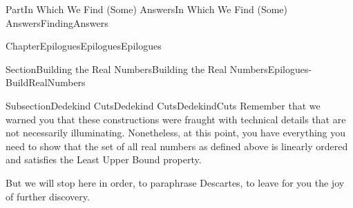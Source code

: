 \documentclass[oneside,10pt,]{book}
\numberwithin{equation}{part}
\providecommand\phantomsection{}
\begin{document}
\begin{partptx}{Part}{In Which We Find (Some) Answers}{}{In Which We Find (Some) Answers}{}{}{FindingAnswers}
\begin{chapterptx}{Chapter}{Epilogues}{}{Epilogues}{}{}{Epilogues}
\begin{sectionptx}{Section}{Building the Real Numbers}{}{Building the Real Numbers}{}{}{Epilogues-BuildRealNumbers}
\begin{subsectionptx}{Subsection}{Dedekind Cuts}{}{Dedekind Cuts}{}{}{DedekindCuts}
Remember that we warned you that these constructions were fraught with technical details that are not necessarily illuminating.  Nonetheless, at this point, you have everything you need to show that the set of all real numbers as defined above is linearly ordered and satisfies the Least Upper Bound property.%
\par
But we will stop here in order, to paraphrase Descartes, to leave for you the joy of further discovery.%
\end{subsectionptx}
\end{sectionptx}
\end{chapterptx}
\end{partptx}
%
\backmatter%
%
\clearpage\phantomsection%
%
%
%
\typeout{************************************************}
\typeout{************************************************}
%
\end{document}
